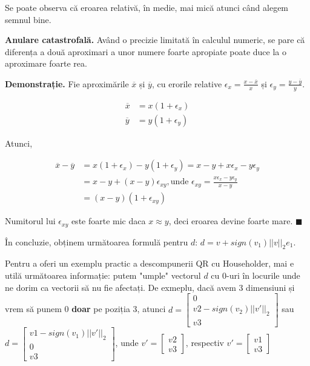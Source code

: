 \documentclass{exam}
\begin{document}
\par Se poate observa că eroarea relativă, în medie, mai mică atunci când alegem
semnul bine.

\par \textbf{Anulare catastrofală.} Având o precizie limitată în calculul
numeric, se pare că diferența a două aproximari a unor numere foarte apropiate
poate duce la o aproximare foarte rea.

\par \textbf{Demonstrație.} Fie aproximările $\overline{x}$ și $\overline{y}$,
cu erorile relative $\epsilon_x = \frac{x - \overline{x}}{x}$ și $\epsilon_y = \frac{y - \overline{y}}{y}$.

\begin{align*}
	\overline{x} & = x(1 + \epsilon_x) \\
	\overline{y} & = y(1 + \epsilon_y)
\end{align*}

\par Atunci,

\begin{align*}
	\overline{x} - \overline{y} & = x(1 + \epsilon_x) - y(1 + \epsilon_y) = x - y + x \epsilon_x - y \epsilon_y                           \\
	                            & = x - y + (x - y) \epsilon_{xy}, \text{unde } \epsilon_{xy} = \frac{x \epsilon_x - y \epsilon_y}{x - y} \\
	                            & = (x - y)(1 + \epsilon_{xy})
\end{align*}

\par Numitorul lui $\epsilon_{xy}$ este foarte mic daca $x \approx y$, deci
eroarea devine foarte mare. $\blacksquare$

\par În concluzie, obținem următoarea formulă pentru $d$: $d = v + sign(v_1) ||v||_2 e_1$.

\par Pentru a oferi un exemplu practic a descompunerii QR cu Householder, mai
e utilă următoarea informație: putem "umple" vectorul $d$ cu 0-uri în locurile
unde ne dorim ca vectorii să nu fie afectați. De exmeplu, dacă avem 3 dimensiuni
și vrem să punem 0 \textbf{doar} pe poziția 3, atunci $d = \begin{bmatrix} 0 \\ v2 - sign(v_2) ||v'||_2 \\ v3 \end{bmatrix}$
sau $d = \begin{bmatrix} v1 - sign(v_1) ||v'||_2 \\ 0 \\ v3 \end{bmatrix}$, unde $v' = \begin{bmatrix} v2 \\ v3 \end{bmatrix}$,
respectiv $v' = \begin{bmatrix} v1 \\ v3 \end{bmatrix}$
\end{document}
